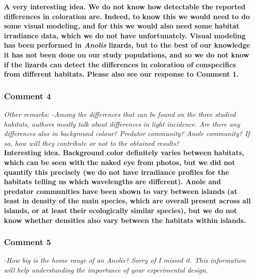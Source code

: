 \documentclass{article}
\begin{document}
	\textbf{A very interesting idea. We do not know how detectable the reported differences in coloration are. Indeed, to know this we would need to do some visual modeling, and for this we would also need some habitat irradiance data, which we do not have unfortunately. Visual modeling has been performed in \textit{Anolis} lizards, but to the best of our knowledge it has not been done on our study populations, and so we do not know if the lizards can detect the differences in coloration of conspecifics from different habitats. Please also see our response to Comment 1.}
	
	\subsubsection*{Comment 4}
	
	\textit{Other remarks:
	-Among the differences that can be found on the three studied habitats, authors mostly talk about differences in light incidence. Are there any differences also in background colour? Predator community? Anole community? If so, how will they contribute or not to the obtained results?}\\
	
	\textbf{Interesting idea. Background color definitely varies between habitats, which can be seen with the naked eye from photos, but we did not quantify this precisely (we do not have irradiance profiles for the habitats telling us which wavelengths are different). Anole and predator communities have been shown to vary between islands (at least in density of the main species, which are overall present across all islands, or at least their ecologically similar species), but we do not know whether densities also vary between the habitats within islands.}
	
	\subsubsection*{Comment 5}
	
	\textit{-How big is the home range of an Anolis? Sorry of I missed it. This information will help understanding the importance of your experimental design.}\\
	
\end{document}
